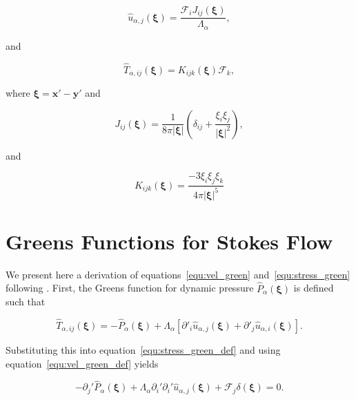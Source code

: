 \documentclass[12pt]{article}
\begin{document}
\begin{equation}
\label{equ:vel_green}
\hat{u}_{\alpha,j}(\boldsymbol{\xi}) = \frac{\mathcal{F}_{i} J_{ij}(\boldsymbol{\xi})}{\Lambda_{\alpha}} ,
\end{equation}

and 

\begin{equation}
\label{equ:stress_green}
\hat{T}_{\alpha, ij}(\boldsymbol{\xi}) = K_{ijk}(\boldsymbol{\xi}) \mathcal{F}_{k} ,
\end{equation}

where $\boldsymbol{\xi} = \boldsymbol{x'} - \boldsymbol{y'}$ and 

\begin{equation}
\label{equ:J_kernal}
J_{ij}(\boldsymbol{\xi}) = \frac{1}{8 \pi |\boldsymbol{\xi}|} \left( \delta_{ij} + \frac{\xi_{i} \xi_{j}}{|\boldsymbol{\xi}|^{2}} \right) ,
\end{equation}

and

\begin{equation}
\label{equ:K_kernal}
K_{ijk}(\boldsymbol{\xi}) = \frac{-3 \xi_{i} \xi_{j} \xi_{k}}{4 \pi |\boldsymbol{\xi}|^{5}}
\end{equation}

\appendix

\section{Greens Functions for Stokes Flow}
\label{app:Greens}

We present here a derivation of equations~\ref{equ:vel_green} and~\ref{equ:stress_green} following \citet{Ladyzhenskaya63}. First, the Greens function for dynamic pressure $\hat{P}_{\alpha}(\boldsymbol{\xi})$ is defined such that

\begin{equation}
\label{equ:press_green_def}
\hat{T}_{\alpha, ij}(\boldsymbol{\xi}) = - \hat{P}_{\alpha}(\boldsymbol{\xi}) + \Lambda_{\alpha}[\partial'_{i} \hat{u}_{\alpha,j}(\boldsymbol{\xi}) + \partial'_{j} \hat{u}_{\alpha,i}(\boldsymbol{\xi})] .
\end{equation}


Substituting this into equation~\ref{equ:stress_green_def} and using equation~\ref{equ:vel_green_def} yields 

\begin{equation}
\label{equ:stokes_green}
-\partial_{j}' \hat{P}_{\alpha}(\boldsymbol{\xi}) + \Lambda_{\alpha} \partial_{i}' \partial_{i}' \hat{u}_{\alpha,j}(\boldsymbol{\xi}) + \mathcal{F}_{j} \delta(\boldsymbol{\xi}) = 0 .
\end{equation}
\end{document}
